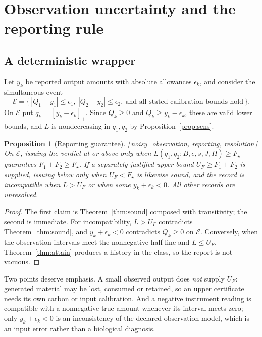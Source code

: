 \documentclass[11pt]{article}
\theoremstyle{plain}
\newtheorem{proposition}[theorem]{Proposition}
\theoremstyle{definition}
\theoremstyle{remark}
\newcommand{\pos}[1]{\left[#1\right]_{+}}
\newcommand{\leanref}[1]{{\normalfont\sffamily\footnotesize[\,#1\,]}}
\newcommand{\Lc}{L}
\begin{document}
\section{Observation uncertainty and the reporting rule}\label{sec:noise}

\subsection{A deterministic wrapper}

Let $y_k$ be reported output amounts with absolute allowances $\epsilon_k$,
and consider the simultaneous event
\[
 \mathcal E=\bigl\{\,|Q_1-y_1|\le\epsilon_1,\ |Q_2-y_2|\le\epsilon_2,\
 \text{and all stated calibration bounds hold}\,\bigr\}.
\]
On $\mathcal E$ put $q_k=\pos{y_k-\epsilon_k}$. Since $Q_k\ge0$ and
$Q_k\ge y_k-\epsilon_k$, these are valid lower bounds, and $\Lc$ is
nondecreasing in $q_1,q_2$ by Proposition~\ref{prop:sens}.

\begin{proposition}[Reporting guarantee]\label{prop:report}
\leanref{noisy\_observation, reporting, resolution}
On $\mathcal E$, issuing the verdict \emph{at or above} only when
$\Lc(q_1,q_2;B,e,s,J,H)\ge F_\star$ guarantees $F_1+F_2\ge F_\star$. If a
separately justified upper bound $U_F\ge F_1+F_2$ is supplied, issuing
\emph{below} only when $U_F<F_\star$ is likewise sound, and the record is
\emph{incompatible} when $\Lc>U_F$ or when some $y_k+\epsilon_k<0$. All other
records are \emph{unresolved}.
\end{proposition}

\begin{proof}
The first claim is Theorem~\ref{thm:sound} composed with transitivity; the
second is immediate. For incompatibility, $\Lc>U_F$ contradicts
Theorem~\ref{thm:sound}, and $y_k+\epsilon_k<0$ contradicts $Q_k\ge0$ on
$\mathcal E$. Conversely, when the observation intervals meet the nonnegative
half-line and $\Lc\le U_F$, Theorem~\ref{thm:attain} produces a history in the
class, so the report is not vacuous.
\end{proof}

Two points deserve emphasis. A small observed output does \emph{not} supply
$U_F$: generated material may be lost, consumed or retained, so an upper
certificate needs its own carbon or input calibration. And a negative
instrument reading is compatible with a nonnegative true amount whenever its
interval meets zero; only $y_k+\epsilon_k<0$ is an inconsistency of the
declared observation model, which is an input error rather than a biological
diagnosis.
\end{document}
